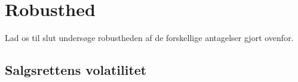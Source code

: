 \documentclass{article}
\begin{document}
\section{Robusthed}
\label{sec:antag}
Lad os til slut undersøge robustheden af de forskellige antagelser gjort ovenfor. 

\subsection{Salgsrettens volatilitet}


\begin{table}[h]
\centering
	\caption{V\ae{}rdi af option og egenkapital som funktion af initial markedsvaerdi og options-volatilitet}
	\label{tab:robust_vary_sigma}
\end{table}
\end{document}
